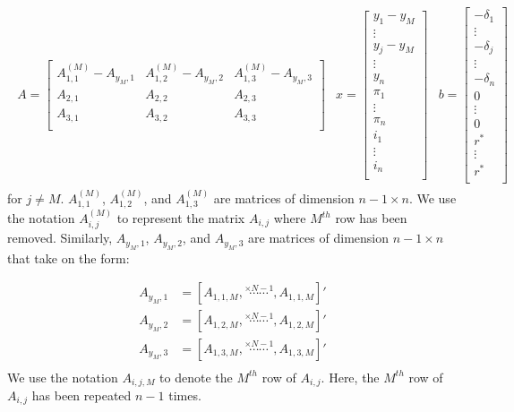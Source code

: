 \documentclass[11pt]{article}
\begin{document}
\begin{singlespace}
		\begin{align*}
		\begin{array}{ccc}
		A = 
		\begin{bmatrix}
		A_{1,1}^{(M)} - A_{y_{M},1}  & A_{1,2}^{(M)}  - A_{y_{M},2} & A_{1,3}^{(M)}  - A_{y_{M},3} \\
		A_{2,1} & A_{2,2} & A_{2,3} \\
		A_{3,1} & A_{3,2} & A_{3,3} \\
		\end{bmatrix} & 
		x =
		\begin{bmatrix}
		y_1 - y_M\\
		\vdots\\
		y_j - y_M\\
		\vdots\\
		y_n\\
		\pi_1\\
		\vdots\\
		\pi_n\\
		i_1\\
		\vdots\\
		i_n\\
		\end{bmatrix}& 
		b =
		\begin{bmatrix}
		- \delta_1\\
		\vdots\\
		- \delta_j\\
		\vdots\\
		- \delta_n\\
		0\\
		\vdots\\
		0\\
		r^* \\
		\vdots\\
		r^* \\			
		\end{bmatrix}
		\end{array}
		\end{align*}
		for $j \neq M$. $A_{1,1}^{(M)}$, $A_{1,2}^{(M)}$, and $A_{1,3}^{(M)}$ are matrices of dimension $n-1 \times n$. We use the notation $A_{i,j}^{(M)}$ to represent the matrix $A_{i,j}$ where $M^{th}$ row has been removed. Similarly, $A_{y_{M},1}$, $A_{y_{M},2}$, and  $A_{y_{M},3}$ are matrices of dimension $n-1 \times n$ that take on the form:   
		
		\begin{align*}
		A_{y_{M},1} &= [A_{1,1,M},\stackrel{\times N-1}{\cdots\cdots},A_{1,1,M}]'\\
		A_{y_{M},2} &= [A_{1,2,M},\stackrel{\times N-1}{\cdots\cdots},A_{1,2,M}]'\\
		A_{y_{M},3} &= [A_{1,3,M},\stackrel{\times N-1}{\cdots\cdots},A_{1,3,M}]'\\
		\end{align*}
		We use the notation $A_{i,j,M}$ to denote the $M^{th}$ row of $A_{i,j}$. Here, the $M^{th}$ row of $A_{i,j}$ has been repeated $n-1$ times. 
		

\end{singlespace}
\end{document}
